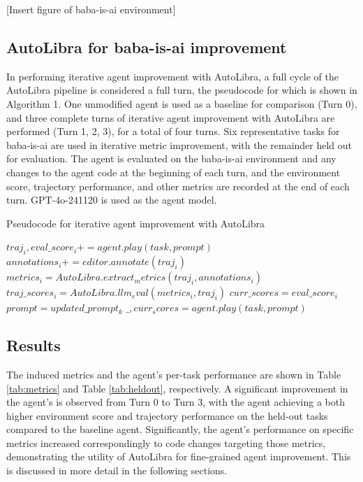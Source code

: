 [Insert figure of baba-is-ai environment]

\subsection{AutoLibra for baba-is-ai improvement}

In performing iterative agent improvement with AutoLibra, a full cycle of the AutoLibra pipeline is considered a full turn, the pseudocode for which is shown in Algorithm 1. One unmodified agent is used as a baseline for comparison (Turn 0), and three complete turns of iterative agent improvement with AutoLibra are performed (Turn 1, 2, 3), for a total of four turns. Six representative tasks for baba-is-ai are used in iterative metric improvement, with the remainder held out for evaluation. The agent is evaluated on the baba-is-ai environment and any changes to the agent code at the beginning of each turn, and the environment score, trajectory performance, and other metrics are recorded at the end of each turn. GPT-4o-241120 is used as the agent model.


\begin{algorithm}
    \caption{Pseudocode for iterative agent improvement with AutoLibra}
    \begin{algorithmic}[1]
            \State $traj_i, eval\_score_i += agent.play(task, prompt)$
            \State $annotations_i += editor.annotate(traj_i)$
        \EndFor
        \State $metrics_i = AutoLibra.extract_metrics(traj_i, annotations_i)$
        \State $traj\_scores_i = AutoLibra.llm_eval(metrics_i, traj_i)$
        \State $curr\_scores = eval\_score_i$
            \State $prompt = updated\_prompt_k$
                \State $\_, curr_scores = agent.play(task, prompt)$
            \EndFor
        \EndWhile
    \EndFor

    \end{algorithmic}
\end{algorithm}




\subsection{Results}

The induced metrics and the agent's per-task performance are shown in Table \ref{tab:metrics} and Table \ref{tab:heldout}, respectively. A significant improvement in the agent's is observed from Turn 0 to Turn 3, with the agent achieving a both higher environment score and trajectory performance on the held-out tasks compared to the baseline agent. Significantly, the agent's performance on specific metrics increased correspondingly to code changes targeting those metrics, demonstrating the utility of AutoLibra for fine-grained agent improvement. This is discussed in more detail in the following sections.

